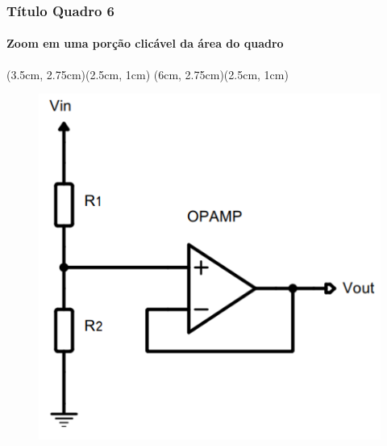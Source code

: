\documentclass{beamer}
\begin{document}
\begin{frame}
\frametitle{Título Quadro 6}
\framesubtitle{Zoom em uma porção clicável da área do quadro}

\hypersetup{linkbordercolor=yellow}

(3.5cm, 2.75cm)(2.5cm, 1cm)
(6cm, 2.75cm)(2.5cm, 1cm)
\begin{figure}
	\centering
	\includegraphics[scale=0.3]{figuras/divisorTensao_20241001b.png}
\end{figure}
	
\end{frame}
\end{document}
